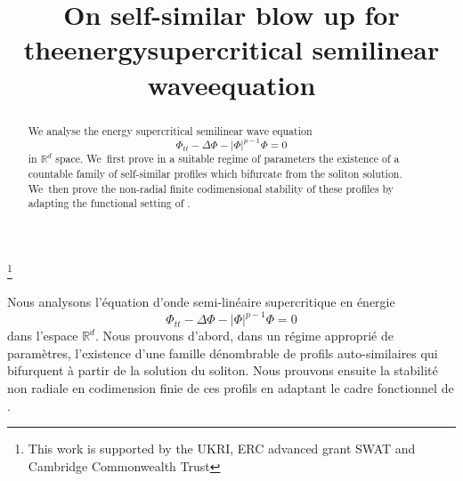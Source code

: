 \documentclass[JEP,XML,SOM,Unicode]{cedram}
\theoremstyle{plain}
\theoremstyle{definition}
\begin{document}
\frontmatter

\title{On self-similar blow up for the\nobreakspace energy\nobreakspace supercritical semilinear wave\nobreakspace equation}

\author[\initial{J.} \lastname{Kim}]{ }
\address{Department of Pure Mathematics and Mathematical Statistics,
University of Cambridge,\\
Wilberforce Road, Cambridge CB3 0WB, UK}
\urladdr{}

\thanks{This work is supported by the UKRI, ERC advanced grant SWAT and Cambridge Commonwealth Trust}

\begin{abstract}
We analyse the energy supercritical semilinear wave equation
\[
\Phi_{tt}-\Delta\Phi-|\Phi|^{p-1} \Phi=0
\]
in $\mathbb R^d$ space. We~first prove in a suitable regime of parameters the existence of a countable family of self-similar profiles which bifurcate from the soliton solution. We~then prove the non-radial finite codimensional stability of these profiles by adapting the functional setting of \cite{MRRS}.
\end{abstract}





\begin{altabstract}
Nous analysons l'équation d'onde semi-linéaire supercritique en énergie
\[
\Phi_{tt}-\Delta\Phi-|\Phi|^{p-1} \Phi=0
\]
dans l'espace $\mathbb R^d$. Nous prouvons d'abord, dans un régime approprié de paramètres, l'existence d'une famille dénombrable de profils auto-similaires qui bifurquent à partir de la solution du soliton. Nous prouvons ensuite la stabilité non radiale en codimension finie de ces profils en adaptant le cadre fonctionnel de \cite{MRRS}.
\end{altabstract}

\maketitle
\vspace*{-\baselineskip}
\tableofcontents
\mainmatter
\end{document}
